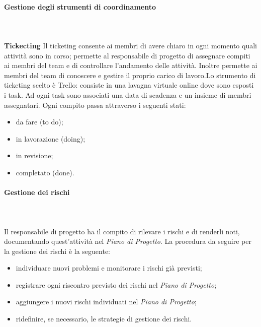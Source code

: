 			\paragraph{Gestione degli strumenti di coordinamento} \mbox{}\\ \mbox{}\\
			\textbf{Tickecting} \newline \newline
			Il ticketing consente ai membri di avere chiaro in ogni momento quali attività sono in corso; permette al responsabile di progetto di assegnare compiti ai membri del team e di controllare l'andamento delle attività. Inoltre permette ai membri del team di conoscere e gestire il proprio carico di lavoro.\newline Lo strumento di ticketing scelto è Trello: consiste in una lavagna virtuale online dove sono esposti i task. Ad ogni task sono associati una data di scadenza e un insieme di membri assegnatari. Ogni compito passa attraverso i seguenti stati:
			\begin{itemize}
				\item da fare (to do);
				\item in lavorazione (doing);
				\item in revisione;
				\item completato (done).
			\end{itemize}


			\paragraph{Gestione dei rischi} \mbox{}\\ \mbox{}\\
			Il responsabile di progetto ha il compito di rilevare i rischi e di renderli noti, documentando quest'attività nel \textit{Piano di Progetto}. La procedura da seguire per la gestione dei rischi è la seguente:
			\begin{itemize}
				\item individuare nuovi problemi e monitorare i rischi già previsti;
				\item registrare ogni riscontro previsto dei rischi nel \textit{Piano di Progetto};
				\item aggiungere i nuovi rischi individuati nel \textit{Piano di Progetto};
				\item ridefinire, se necessario, le strategie di gestione dei rischi.

			\end{itemize}
			
